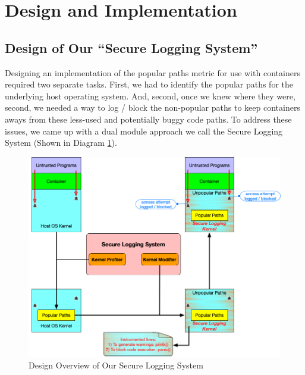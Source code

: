 \section{Design and Implementation}
\label{sec.design}

\subsection{Design of Our ``Secure Logging System''}
\label{sec.design.secure_logging_system}
Designing an implementation of the popular paths metric for use with containers required two separate tasks. 
First, we had to identify the popular paths for the underlying host operating system. 
And, second, once we knew where they were, second, we needed a way to log / block the non-popular paths to keep containers aways from these less-used 
and potentially buggy code paths. To address these issues, we came up with a dual module approach we call the Secure Logging System (Shown in Diagram \ref{fig:design}). 

\begin{figure}
\centering
\includegraphics[width=1.5\columnwidth]{diagram/design.png}
\caption{\small Design Overview of Our Secure Logging System}
\label{fig:design}
\end{figure}

